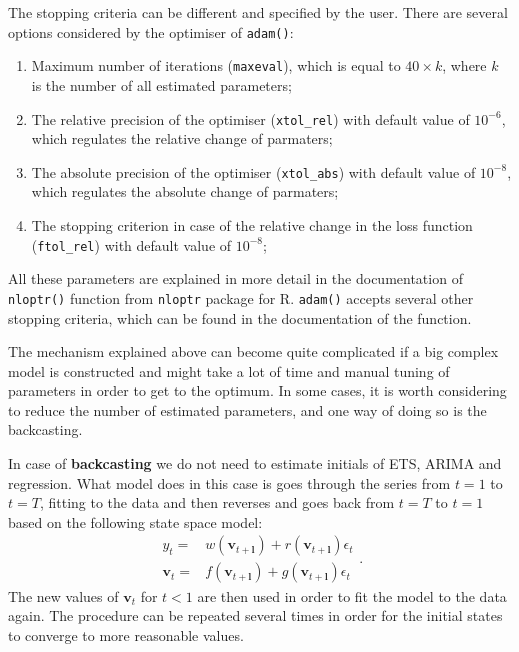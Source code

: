 \documentclass[
]{book}
\providecommand{\tightlist}{%
  \setlength{\itemsep}{0pt}\setlength{\parskip}{0pt}}
\theoremstyle{definition}
\theoremstyle{definition}
\theoremstyle{definition}
\theoremstyle{definition}
\theoremstyle{remark}
\begin{document}
The stopping criteria can be different and specified by the user. There are several options considered by the optimiser of \texttt{adam()}:

\begin{enumerate}
\def\labelenumi{\arabic{enumi}.}
\tightlist
\item
  Maximum number of iterations (\texttt{maxeval}), which is equal to \(40\times k\), where \(k\) is the number of all estimated parameters;
\item
  The relative precision of the optimiser (\texttt{xtol\_rel}) with default value of \(10^{-6}\), which regulates the relative change of parmaters;
\item
  The absolute precision of the optimiser (\texttt{xtol\_abs}) with default value of \(10^{-8}\), which regulates the absolute change of parmaters;
\item
  The stopping criterion in case of the relative change in the loss function (\texttt{ftol\_rel}) with default value of \(10^{-8}\);
\end{enumerate}

All these parameters are explained in more detail in the documentation of \texttt{nloptr()} function from \texttt{nloptr} package for R. \texttt{adam()} accepts several other stopping criteria, which can be found in the documentation of the function.

The mechanism explained above can become quite complicated if a big complex model is constructed and might take a lot of time and manual tuning of parameters in order to get to the optimum. In some cases, it is worth considering to reduce the number of estimated parameters, and one way of doing so is the backcasting.

In case of \textbf{backcasting} we do not need to estimate initials of ETS, ARIMA and regression. What model does in this case is goes through the series from \(t=1\) to \(t=T\), fitting to the data and then reverses and goes back from \(t=T\) to \(t=1\) based on the following state space model:
\begin{equation}
  \begin{aligned}
  {y}_{t} = &w(\mathbf{v}_{t+\boldsymbol{l}}) + r(\mathbf{v}_{t+\boldsymbol{l}}) \epsilon_t \\
  \mathbf{v}_{t} = &f(\mathbf{v}_{t+\boldsymbol{l}}) + g(\mathbf{v}_{t+\boldsymbol{l}}) \epsilon_t
  \end{aligned}.
  \label{eq:ETSADAMStateSpaceBackwards}
\end{equation}
The new values of \(\mathbf{v}_t\) for \(t<1\) are then used in order to fit the model to the data again. The procedure can be repeated several times in order for the initial states to converge to more reasonable values.
\end{document}
